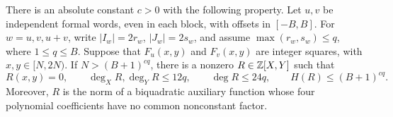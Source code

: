 \begin{proposition}
\label{p13:rig:two-witnesses}
There is an absolute constant $c>0$ with the following property.
Let $u,v$ be independent formal words, even in each block,
with offsets in $[-B,B]$.  For $w=u,v,u+v$, write
$|I_w|=2r_w$, $|J_w|=2s_w$, and assume
$\max(r_w,s_w)\le q$, where $1\le q\le B$.
Suppose that $F_u(x,y)$ and $F_v(x,y)$ are integer squares,
with $x,y\in[N,2N)$.  If $N>(B+1)^{cq}$, there is a
nonzero $R\in\mathbb Z[X,Y]$ such that
\begin{equation}
 R(x,y)=0,\qquad
 \deg_XR,\deg_YR\le12q,\qquad \deg R\le24q,
 \qquad H(R)\le(B+1)^{cq}.
 \label{p13:rig:two-polynomial}
\end{equation}
Moreover, $R$ is the norm of a biquadratic auxiliary function
whose four polynomial coefficients have no common nonconstant
factor.
\end{proposition}

